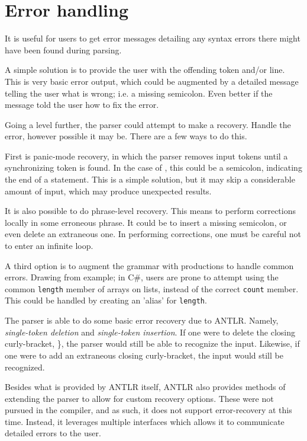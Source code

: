 \section{Error handling}
It is useful for users to get error messages detailing any syntax errors there might have been found during parsing.

A simple solution is to provide the user with the offending token and/or line. This is very basic error output, which could be augmented by a detailed message telling the user what is wrong; i.e. a missing semicolon. Even better if the message told the user how to fix the error. 

Going a level further, the parser could attempt to make a recovery. Handle the error, however possible it may be. There are a few ways to do this.

First is panic-mode recovery, in which the parser removes input tokens until a synchronizing token is found. In the case of \dazel{}, this could be a semicolon, indicating the end of a statement. This is a simple solution, but it may skip a considerable amount of input, which may produce unexpected results\cite{crafting_a_compiler}.

It is also possible to do phrase-level recovery. This means to perform corrections locally in some erroneous phrase. It could be to insert a missing semicolon, or even delete an extraneous one. In performing corrections, one must be careful not to enter an infinite loop\cite{spo_course}.

A third option is to augment the grammar with productions to handle common errors\cite{spo_course}. Drawing from example; in C\#, users are prone to attempt using the common \texttt{length} member of arrays on lists, instead of the correct \texttt{count} member. This could be handled by creating an 'alias' for \texttt{length}.

The \dazel{} parser is able to do some basic error recovery due to ANTLR. Namely, \textit{single-token deletion} and \textit{single-token insertion}. If one were to delete the closing curly-bracket, \}, the parser would still be able to recognize the input. Likewise, if one were to add an extraneous closing curly-bracket, the input would still be recognized.

Besides what is provided by ANTLR itself, ANTLR also provides methods of extending the parser to allow for custom recovery options. These were not pursued in the \dazel{} compiler, and as such, it does not support error-recovery at this time. Instead, it leverages multiple interfaces which allows it to communicate detailed errors to the user.

